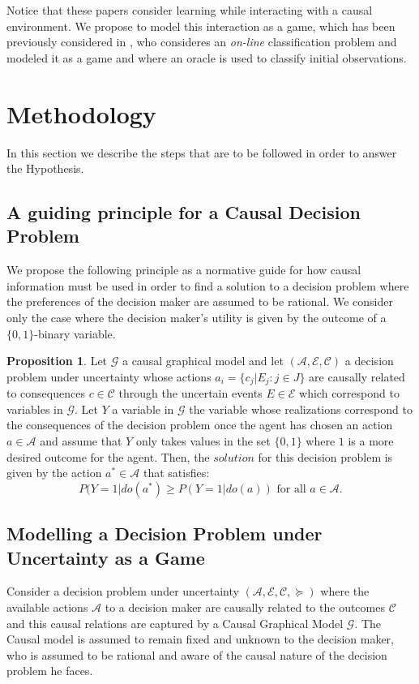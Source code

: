 \documentclass[english,letterpaper,12pt,final]{article}
\theoremstyle{definition}
\newtheorem{prop}{Proposition}[section]
\begin{document}
Notice that these papers consider learning while interacting with a causal environment. We propose to model this interaction as a game, which has been previously considered in \cite{werling2015job}, who consideres an \textit{on-line} classification problem and modeled it as a game and where an oracle is used to classify initial observations.

\newpage
\section{Methodology}
In this section we describe the steps that are to be followed in order to answer the Hypothesis.
\subsection{A guiding principle for a Causal Decision Problem}
We propose the following principle as a normative guide for how causal information must be used in order to find a solution to a decision problem where the preferences of the decision maker are assumed to be rational. We consider only the case where the decision maker's utility is given by the outcome of a $\{0,1 \}$-binary variable.
\begin{prop}
Let  $\mathcal{G}$ a causal graphical model and let $(\mathcal{A},\mathcal{E},\mathcal{C})$ a decision problem under uncertainty whose actions $a_i = \{ c_j | E_j : j \in J \}$  are causally related to consequences $c \in \mathcal{C}$ through the uncertain events $E \in \mathcal{E}$ which correspond to variables in $\mathcal{G}$. Let $Y$ a variable in $\mathcal{G}$ the variable whose realizations correspond to the consequences of the decision problem once the agent has chosen an action $a \in \mathcal{A}$ and assume that $Y$ only takes values in the set $\{ 0,1\}$ where $1$ is a more desired outcome for the agent. Then, the $\textit{solution}$ for this decision problem is given by the action $a^\ast \in \mathcal{A}$ that satisfies:
\[ P(Y=1 | do(a^\ast) \geq P(Y=1 | do(a)) \textrm{ for all } a \in \mathcal{A}. \]
\end{prop}
\subsection{Modelling a Decision Problem under Uncertainty as a Game}
Consider a decision problem under uncertainty $(\mathcal{A},\mathcal{E},\mathcal{C},\succeq)$ where the available actions $\mathcal{A}$ to a decision maker are causally related to the outcomes $\mathcal{C}$ and this causal relations are captured by a Causal Graphical Model $\mathcal{G}$. The Causal model is assumed to remain fixed and unknown to the decision maker, who is assumed to be rational and aware of the causal nature of the decision problem he faces.  
\end{document}
